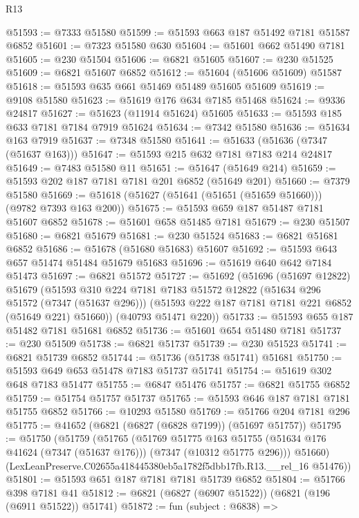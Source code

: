 \begin{lexlean}{R13}
\begin{coremodule}
@51593 := @7333 @51580
@51599 := @51593 @663 @187 @51492 @7181 @51587 @6852
@51601 := @7323 @51580 @630
@51604 := @51601 @662 @51490 @7181
@51605 := @230 @51504
@51606 := @6821 @51605
@51607 := @230 @51525
@51609 := @6821 @51607 @6852
@51612 := @51604 (@51606 @51609) @51587
@51618 := @51593 @635 @661 @51469 @51489 @51605 @51609
@51619 := @9108 @51580
@51623 := @51619 @176 @634 @7185 @51468
@51624 := @9336 @24817
@51627 := @51623 (@11914 @51624) @51605
@51633 := @51593 @185 @633 @7181 @7184 @7919 @51624
@51634 := @7342 @51580
@51636 := @51634 @163 @7919
@51637 := @7348 @51580
@51641 := @51633 (@51636 (@7347 (@51637 @163)))
@51647 := @51593 @215 @632 @7181 @7183 @214 @24817
@51649 := @7483 @51580 @11
@51651 := @51647 (@51649 @214)
@51659 := @51593 @202 @187 @7181 @7181 @201 @6852 (@51649 @201)
@51660 := @7379 @51580
@51669 := @51618 (@51627 (@51641 (@51651 (@51659 @51660))) (@9782 @7393 @163 @200))
@51675 := @51593 @659 @187 @51487 @7181 @51607 @6852
@51678 := @51601 @658 @51485 @7181
@51679 := @230 @51507
@51680 := @6821 @51679
@51681 := @230 @51524
@51683 := @6821 @51681 @6852
@51686 := @51678 (@51680 @51683) @51607
@51692 := @51593 @643 @657 @51474 @51484 @51679 @51683
@51696 := @51619 @640 @642 @7184 @51473
@51697 := @6821 @51572
@51727 := @51692
    (@51696
      (@51697 @12822)
      @51679
      (@51593
        @310
        @224
        @7181
        @7183
        @51572
        @12822
        (@51634 @296 @51572 (@7347 (@51637 @296)))
        (@51593 @222 @187 @7181 @7181 @221 @6852 (@51649 @221) @51660))
      (@40793 @51471 @220))
@51733 := @51593 @655 @187 @51482 @7181 @51681 @6852
@51736 := @51601 @654 @51480 @7181
@51737 := @230 @51509
@51738 := @6821 @51737
@51739 := @230 @51523
@51741 := @6821 @51739 @6852
@51744 := @51736 (@51738 @51741) @51681
@51750 := @51593 @649 @653 @51478 @7183 @51737 @51741
@51754 := @51619 @302 @648 @7183 @51477
@51755 := @6847 @51476
@51757 := @6821 @51755 @6852
@51759 := @51754 @51757 @51737
@51765 := @51593 @646 @187 @7181 @7181 @51755 @6852
@51766 := @10293 @51580
@51769 := @51766 @204 @7181 @296
@51775 := @41652 (@6821 (@6827 (@6828 @7199)) (@51697 @51757))
@51795 := @51750
    (@51759
      (@51765
        (@51769
          @51775
          @163
          @51755
          (@51634 @176 @41624 (@7347 (@51637 @176)))
          (@7347 (@10312 @51775 @296)))
        @51660)
      (LexLeanPreserve.C02655a418445380eb5a1782f5dbb17fb.R13.__rel_16 @51476))
@51801 := @51593 @651 @187 @7181 @7181 @51739 @6852
@51804 := @51766 @398 @7181 @41
@51812 := @6821 (@6827 (@6907 @51522)) (@6821 (@196 (@6911 @51522)) @51741)
@51872 := fun (subject : @6838) =>

\end{coremodule}
\end{lexlean}

